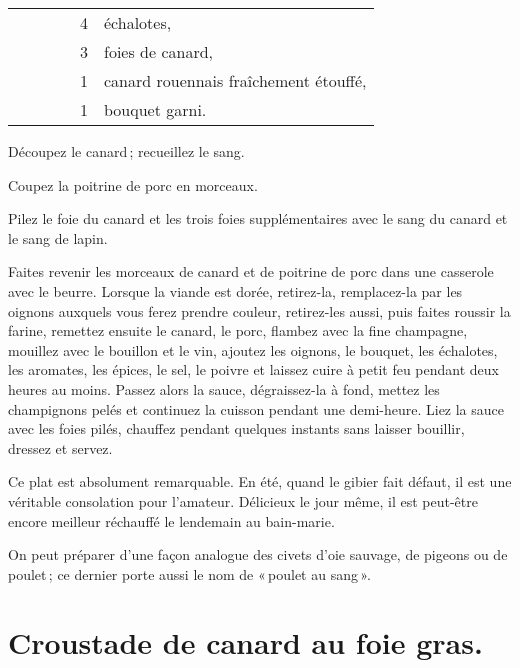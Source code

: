 \begin{longtable}{rrrrrp{16em}}
  & \hspace{2em} &     &         &  4 & échalotes,                                                        \\
  & \hspace{2em} &     &         &  3 & foies de canard,                                                  \\
  & \hspace{2em} &     &         &  1 & canard rouennais fraîchement étouffé,                             \\
  & \hspace{2em} &     &         &  1 & bouquet garni.                                                    \\
\end{longtable}
\normalsize

Découpez le canard ; recueillez le sang.

Coupez la poitrine de porc en morceaux.

Pilez le foie du canard et les trois foies supplémentaires avec le sang du
canard et le sang de lapin.

Faites revenir les morceaux de canard et de poitrine de porc dans une casserole
avec le beurre. Lorsque la viande est dorée, retirez-la, remplacez-la par les
oignons auxquels vous ferez prendre couleur, retirez-les aussi, puis faites
roussir la farine, remettez ensuite le canard, le porc, flambez avec la fine
champagne, mouillez avec le bouillon et le vin, ajoutez les oignons, le
bouquet, les échalotes, les aromates, les épices, le sel, le poivre et laissez
cuire à petit feu pendant deux heures au moins. Passez alors la sauce,
dégraissez-la à fond, mettez les champignons pelés et continuez la cuisson
pendant une demi-heure. Liez la sauce avec les foies pilés, chauffez pendant
quelques instants sans laisser bouillir, dressez et servez.

Ce plat est absolument remarquable. En été, quand le gibier fait défaut, il est
une véritable consolation pour l'amateur. Délicieux le jour même, il est
peut-être encore meilleur réchauffé le lendemain au bain-marie.

\sk

On peut préparer d'une façon analogue des civets d'oie sauvage, de pigeons
ou de poulet ; ce dernier porte aussi le nom de « poulet au sang ».

\section*{\centering Croustade de canard au foie gras.}
{}

